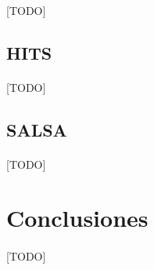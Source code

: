 \documentclass{subfiles}
\begin{document}
        \paragraph{}
        [TODO]

      \subsection{HITS}
      \label{sec:hits}

        \paragraph{}
        [TODO]

      \subsection{SALSA}
      \label{sec:salsa}

        \paragraph{}
        [TODO]

    \section{Conclusiones}
    \label{sec:pagerank_conclusions}

      \paragraph{}
      [TODO]
\end{document}
